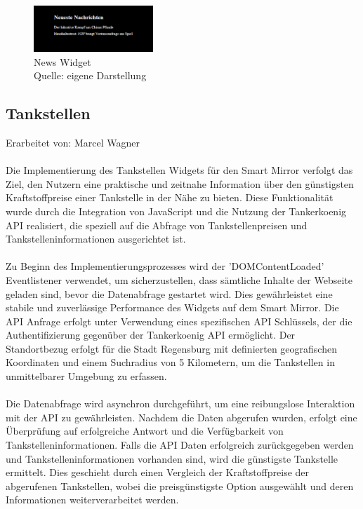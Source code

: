 \begin{figure}[h]
    \centering
    \includegraphics[width=0.4\textwidth]{pictures/news_widget.png}
  \captionsetup{justification=centering, labelformat=simple, singlelinecheck=false}
    \caption{News Widget\\ Quelle: eigene Darstellung}
\end{figure}

\subsection{Tankstellen}
Erarbeitet von: Marcel Wagner \\ \\
\noindent
Die Implementierung des Tankstellen Widgets für den Smart Mirror verfolgt das Ziel, den Nutzern eine praktische und zeitnahe Information über den günstigsten Kraftstoffpreise einer Tankstelle in der Nähe zu bieten. Diese Funktionalität wurde durch die Integration von JavaScript und die Nutzung der Tankerkoenig API realisiert, die speziell auf die Abfrage von Tankstellenpreisen und Tankstelleninformationen ausgerichtet ist. \\ \\
\noindent
Zu Beginn des Implementierungsprozesses wird der 'DOMContentLoaded' Eventlistener verwendet, um sicherzustellen, dass sämtliche Inhalte der Webseite geladen sind, bevor die Datenabfrage gestartet wird. Dies gewährleistet eine stabile und zuverlässige Performance des Widgets auf dem Smart Mirror. Die API Anfrage erfolgt unter Verwendung eines spezifischen API Schlüssels, der die Authentifizierung gegenüber der Tankerkoenig API ermöglicht. Der Standortbezug erfolgt für die Stadt Regensburg mit definierten geografischen Koordinaten und einem Suchradius von 5 Kilometern, um die Tankstellen in unmittelbarer Umgebung zu erfassen. \\ \\
\noindent
Die Datenabfrage wird asynchron durchgeführt, um eine reibungslose Interaktion mit der API zu gewährleisten. Nachdem die Daten abgerufen wurden, erfolgt eine Überprüfung auf erfolgreiche Antwort und die Verfügbarkeit von Tankstelleninformationen. Falls die API Daten erfolgreich zurückgegeben werden und Tankstelleninformationen vorhanden sind, wird die günstigste Tankstelle ermittelt. Dies geschieht durch einen Vergleich der Kraftstoffpreise der abgerufenen Tankstellen, wobei die preisgünstigste Option ausgewählt und deren Informationen weiterverarbeitet werden. \\ \\
